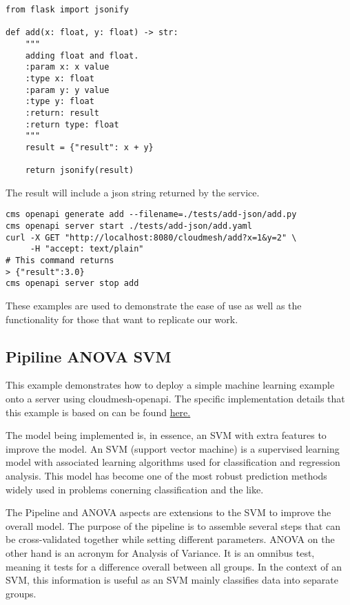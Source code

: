 \begin{verbatim}
from flask import jsonify

def add(x: float, y: float) -> str:
    """
    adding float and float.
    :param x: x value
    :type x: float
    :param y: y value
    :type y: float
    :return: result
    :return type: float
    """
    result = {"result": x + y}

    return jsonify(result)
\end{verbatim}

The result will include a json string returned by the service.

\begin{verbatim}
cms openapi generate add --filename=./tests/add-json/add.py
cms openapi server start ./tests/add-json/add.yaml 
curl -X GET "http://localhost:8080/cloudmesh/add?x=1&y=2" \
     -H "accept: text/plain"
# This command returns
> {"result":3.0}
cms openapi server stop add
\end{verbatim}

These examples are used to demonstrate the ease of use as well as the
functionality for those that want to replicate our work.


\subsection{Pipiline ANOVA SVM}\label{a.2.-pipiline-anova-svm}

This example demonstrates how to deploy a simple machine learning
example onto a server using cloudmesh-openapi. The specific
implementation details that this example is based on can be found
\href{https://scikit-learn.org/stable/auto_examples/feature_selection/plot_feature_selection_pipeline.html}{here.}

The model being implemented is, in essence, an SVM with extra features
to improve the model. An SVM (support vector machine) is a supervised
learning model with associated learning algorithms used for
classification and regression analysis. This model has become one of the
most robust prediction methods widely used in problems conerning
classification and the like.

The Pipeline and ANOVA aspects are extensions to the SVM to improve the
overall model. The purpose of the pipeline is to assemble several steps
that can be cross-validated together while setting different parameters.
ANOVA on the other hand is an acronym for Analysis of Variance. It is an
omnibus test, meaning it tests for a difference overall between all
groups. In the context of an SVM, this information is useful as an SVM
mainly classifies data into separate groups.

